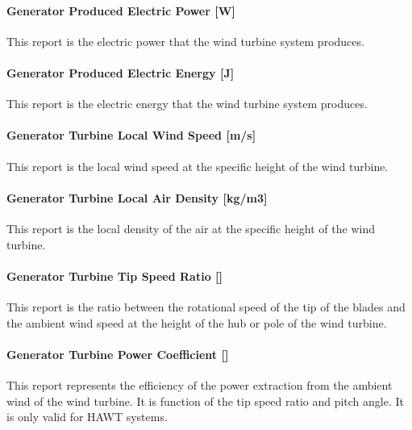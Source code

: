 \paragraph{Generator Produced Electric Power {[}W{]}}\label{generator-produced-electric-power-w-4}

This report is the electric power that the wind turbine system produces.

\paragraph{Generator Produced Electric Energy {[}J{]}}\label{generator-produced-electric-energy-j-4}

This report is the electric energy that the wind turbine system produces.

\paragraph{Generator Turbine Local Wind Speed {[}m/s{]}}\label{generator-turbine-local-wind-speed-ms}

This report is the local wind speed at the specific height of the wind turbine.

\paragraph{Generator Turbine Local Air Density {[}kg/m3{]}}\label{generator-turbine-local-air-density-kgm3}

This report is the local density of the air at the specific height of the wind turbine.

\paragraph{Generator Turbine Tip Speed Ratio {[]}}\label{generator-turbine-tip-speed-ratio}

This report is the ratio between the rotational speed of the tip of the blades and the ambient wind speed at the height of the hub or pole of the wind turbine.

\paragraph{Generator Turbine Power Coefficient {[]}}\label{generator-turbine-power-coefficient}

This report represents the efficiency of the power extraction from the ambient wind of the wind turbine. It is function of the tip speed ratio and pitch angle. It is only valid for HAWT systems.


